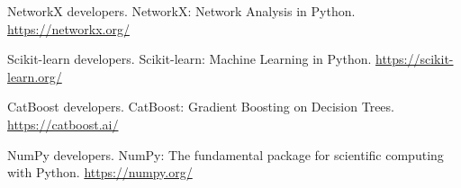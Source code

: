 \documentclass[a4paper,12pt]{report}
\begin{document}
\begin{thebibliography}{99}

 NetworkX developers. NetworkX: Network Analysis in Python. \url{https://networkx.org/}

 Scikit-learn developers. Scikit-learn: Machine Learning in Python. \url{https://scikit-learn.org/}

 CatBoost developers. CatBoost: Gradient Boosting on Decision Trees. \url{https://catboost.ai/}

 NumPy developers. NumPy: The fundamental package for scientific computing with Python. \url{https://numpy.org/}


\end{thebibliography}
\end{document}
